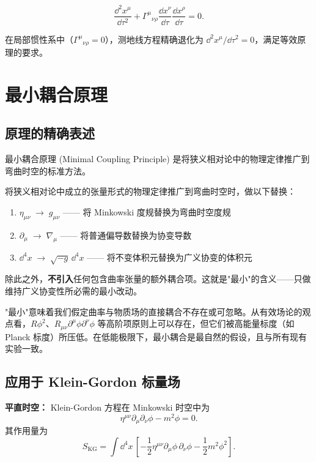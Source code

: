 \begin{equation}
    \boxed{\frac{\dd^2 x^\mu}{\dd\tau^2} + \Gamma^\mu{}_{\nu\rho} \frac{\dd x^\nu}{\dd\tau} \frac{\dd x^\rho}{\dd\tau} = 0}.
\end{equation}

在局部惯性系中（$\Gamma^\mu{}_{\nu\rho} = 0$），测地线方程精确退化为 $\dd^2 x^\mu/\dd\tau^2 = 0$，满足等效原理的要求。

\section{最小耦合原理}

\subsection{原理的精确表述}

最小耦合原理 (Minimal Coupling Principle) 是将狭义相对论中的物理定律推广到弯曲时空的标准方法。

\begin{definition}
将狭义相对论中成立的张量形式的物理定律推广到弯曲时空时，做以下替换：
\begin{enumerate}
    \item $\eta_{\mu\nu} \;\longrightarrow\; g_{\mu\nu}$ —— 将 Minkowski 度规替换为弯曲时空度规
    \item $\partial_\mu \;\longrightarrow\; \nabla_\mu$ —— 将普通偏导数替换为协变导数
    \item $\dd^4 x \;\longrightarrow\; \sqrt{-g} \, \dd^4 x$ —— 将不变体积元替换为广义协变的体积元
\end{enumerate}
除此之外，\textbf{不引入}任何包含曲率张量的额外耦合项。这就是"最小"的含义——只做维持广义协变性所必需的最小改动。
\end{definition}

\begin{note}[为什么是"最小"？]
"最小"意味着我们假定曲率与物质场的直接耦合不存在或可忽略。从有效场论的观点看，$R\phi^2$、$R_{\mu\nu}\partial^\mu\phi\partial^\nu\phi$ 等高阶项原则上可以存在，但它们被高能量标度（如 Planck 标度）所压低。在低能极限下，最小耦合是最自然的假设，且与所有现有实验一致。
\end{note}

\subsection{应用于 Klein-Gordon 标量场}

\textbf{平直时空：} Klein-Gordon 方程在 Minkowski 时空中为
\begin{equation}
    \eta^{\mu\nu}\partial_\mu\partial_\nu \phi - m^2\phi = 0.
\end{equation}
其作用量为
\begin{equation}
    S_{\text{KG}} = \int \dd^4 x \, \left[ -\frac{1}{2}\eta^{\mu\nu}\partial_\mu\phi\,\partial_\nu\phi - \frac{1}{2}m^2\phi^2 \right].
\end{equation}

